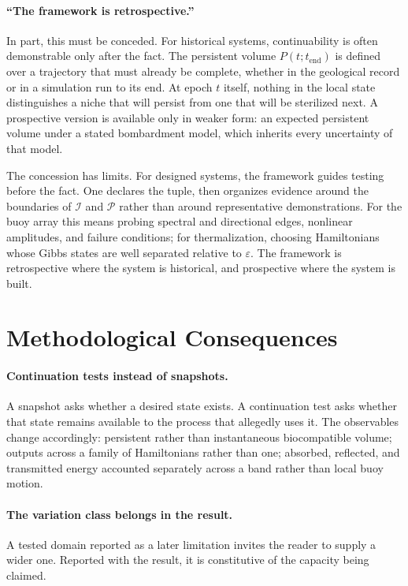 \documentclass[11pt]{article}
\theoremstyle{definition}
\newcommand{\Iset}{\mathcal I}
\newcommand{\Pset}{\mathcal P}
\begin{document}
\paragraph{``The framework is retrospective.''} In part, this must be conceded. For historical systems, continuability is often demonstrable only after the fact. The persistent volume $P(t;t_{\mathrm{end}})$ is defined over a trajectory that must already be complete, whether in the geological record or in a simulation run to its end. At epoch $t$ itself, nothing in the local state distinguishes a niche that will persist from one that will be sterilized next. A prospective version is available only in weaker form: an expected persistent volume under a stated bombardment model, which inherits every uncertainty of that model.

The concession has limits. For designed systems, the framework guides testing before the fact. One declares the tuple, then organizes evidence around the boundaries of $\Iset$ and $\Pset$ rather than around representative demonstrations. For the buoy array this means probing spectral and directional edges, nonlinear amplitudes, and failure conditions; for thermalization, choosing Hamiltonians whose Gibbs states are well separated relative to $\varepsilon$. The framework is retrospective where the system is historical, and prospective where the system is built.

\section{Methodological Consequences}\label{sec:method}

\paragraph{Continuation tests instead of snapshots.} A snapshot asks whether a desired state exists. A continuation test asks whether that state remains available to the process that allegedly uses it. The observables change accordingly: persistent rather than instantaneous biocompatible volume; outputs across a family of Hamiltonians rather than one; absorbed, reflected, and transmitted energy accounted separately across a band rather than local buoy motion.

\paragraph{The variation class belongs in the result.} A tested domain reported as a later limitation invites the reader to supply a wider one. Reported with the result, it is constitutive of the capacity being claimed.
\end{document}
